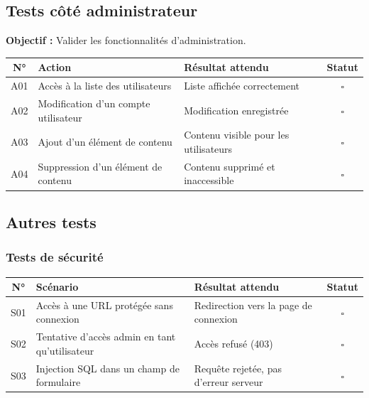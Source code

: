\documentclass[12pt, a4paper]{article}
\begin{document}
\subsection{Tests côté administrateur}

\noindent\textbf{Objectif :} Valider les fonctionnalités d'administration.

\begin{center}
\begin{tabular}{|c|L{4cm}|L{4cm}|c|}
  \hline
  \color{white}\textbf{N°} &
  \color{white}\textbf{Action} &
  \color{white}\textbf{Résultat attendu} &
  \color{white}\textbf{Statut} \\
  \hline
  A01 & Accès à la liste des utilisateurs &
        Liste affichée correctement & $\square$ \\
  \hline
  A02 & Modification d'un compte utilisateur &
        Modification enregistrée & $\square$ \\
  \hline
  A03 & Ajout d'un élément de contenu &
        Contenu visible pour les utilisateurs & $\square$ \\
  \hline
  A04 & Suppression d'un élément de contenu &
        Contenu supprimé et inaccessible & $\square$ \\
  \hline
\end{tabular}
\end{center}

\subsection{Autres tests}

\subsubsection{Tests de sécurité}

\begin{center}
\begin{tabular}{|c|L{4cm}|L{4cm}|c|}
  \hline
  \color{white}\textbf{N°} &
  \color{white}\textbf{Scénario} &
  \color{white}\textbf{Résultat attendu} &
  \color{white}\textbf{Statut} \\
  \hline
  S01 & Accès à une URL protégée sans connexion &
        Redirection vers la page de connexion & $\square$ \\
  \hline
  S02 & Tentative d'accès admin en tant qu'utilisateur &
        Accès refusé (403) & $\square$ \\
  \hline
  S03 & Injection SQL dans un champ de formulaire &
        Requête rejetée, pas d'erreur serveur & $\square$ \\
  \hline
\end{tabular}
\end{center}
\end{document}
